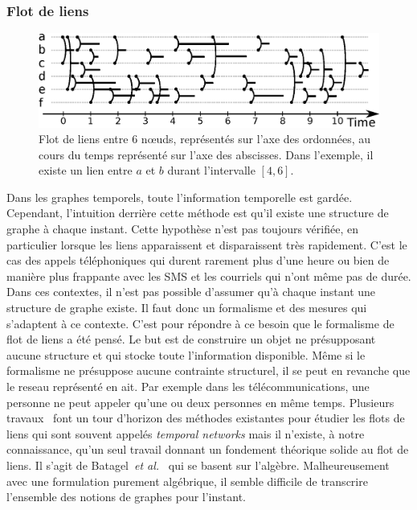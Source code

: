 \subsubsection{Flot de liens}
\begin{figure}[h]
\centering
\includegraphics[width=0.9\linewidth]{img/Intro/Flot_de_liens.eps}
\caption{Flot de liens entre $6$ n\oe uds, représentés sur l'axe des ordonnées, au cours du temps représenté sur l'axe des abscisses.
Dans l'exemple, il existe un lien entre $a$ et $b$ durant l'intervalle $[4,6]$.
}
\label{fig:exemple_Flot_de_liens}
\end{figure}
Dans les graphes temporels, toute l'information temporelle est gardée.
Cependant, l'intuition derrière cette méthode est qu'il existe une structure de graphe à chaque instant.
Cette hypothèse n'est pas toujours vérifiée, en particulier lorsque les liens apparaissent et disparaissent très rapidement.
C'est le cas des appels téléphoniques qui durent rarement plus d'une heure ou bien de manière plus frappante avec les SMS et les courriels qui n'ont même pas de durée.
Dans ces contextes, il n'est pas possible d'assumer qu'à chaque instant une structure de graphe existe.
Il faut donc un formalisme et des mesures qui s'adaptent à ce contexte.
C'est pour répondre à ce besoin que le formalisme de flot de liens a été pensé.
Le but est de construire un objet ne présupposant aucune structure et qui stocke toute l'information disponible.
Même si le formalisme ne présuppose aucune contrainte structurel, il se peut en revanche que le reseau représenté en ait.
Par exemple dans les télécommunications, une personne ne peut appeler qu'une ou deux personnes en même temps.
Plusieurs travaux~\cite{Holme2013a,Holme2015b,Holme2015e} font un tour d'horizon des méthodes existantes pour étudier les flots de liens qui sont souvent appelés \emph{temporal networks} mais il n'existe, à notre connaissance, qu'un seul travail donnant un fondement théorique solide au flot de liens.
Il s'agit de Batagel~\emph{et al.}~\cite{Batagelj2016} qui se basent sur l'algèbre.
Malheureusement avec une formulation purement algébrique, il semble difficile de transcrire l'ensemble des notions de graphes pour l'instant.
\bigskip

